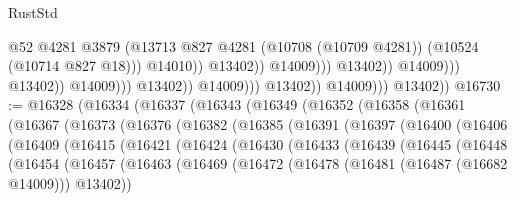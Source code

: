 \begin{lexlean}{RustStd}
\begin{coremodule}
                                                              @52
                                                              @4281
                                                              @3879
                                                              (@13713
                                                                @827
                                                                @4281
                                                                (@10708 (@10709 @4281))
                                                                (@10524 (@10714 @827 @18)))
                                                              @14010))
                                                          @13402))
                                                      @14009)))
                                                @13402))
                                            @14009)))
                                      @13402))
                                  @14009)))
                            @13402))
                        @14009)))
                  @13402))
              @14009)))
        @13402))
@16730 := @16328
    (@16334
      (@16337
        (@16343
          (@16349
            (@16352
              (@16358
                (@16361
                  (@16367
                    (@16373
                      (@16376
                        (@16382
                          (@16385
                            (@16391
                              (@16397
                                (@16400
                                  (@16406
                                    (@16409
                                      (@16415
                                        (@16421
                                          (@16424
                                            (@16430
                                              (@16433
                                                (@16439
                                                  (@16445
                                                    (@16448
                                                      (@16454
                                                        (@16457
                                                          (@16463
                                                            (@16469
                                                              (@16472
                                                                (@16478
                                                                  (@16481 (@16487 (@16682 @14009)))
                                                                  @13402))

\end{coremodule}
\end{lexlean}
